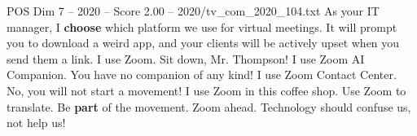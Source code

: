 \begin{textsample}{POS Dim 7 – 2020 – Score 2.00 – 2020/tv\_com\_2020\_104.txt}  \label{ex:f7_pos_081}
As your IT manager, I \textbf{choose} which platform we use for virtual meetings.
It will prompt you to download a weird app, and your clients will be actively upset when you send them a link.
I use Zoom.
Sit down, Mr.
Thompson!
I use Zoom AI Companion.
You have no companion of any kind!
I use Zoom Contact Center.
No, you will not start a movement!
I use Zoom in this coffee shop.
Use Zoom to translate.
Be \textbf{part} of the movement.
Zoom ahead.
Technology should confuse us, not help us!

\end{textsample}
